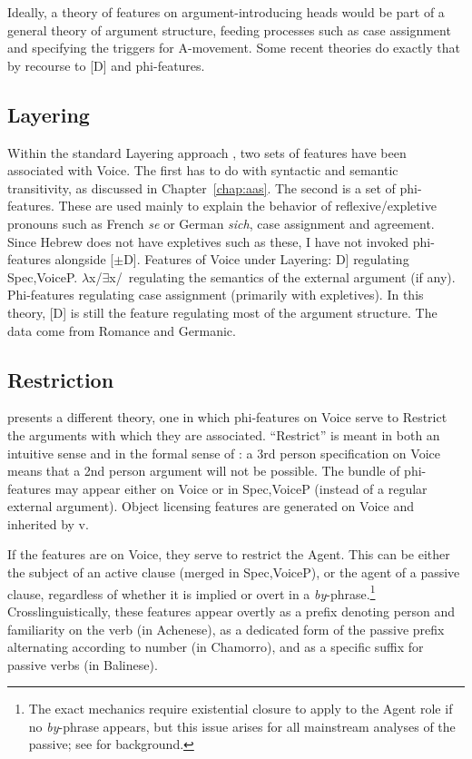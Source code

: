 Ideally, a theory of features on argument-introducing heads would be part of a general theory of argument structure, feeding processes such as case assignment and specifying the triggers for A-movement. Some recent theories do exactly that by recourse to [D] and phi-features.

	\subsection{Layering}
Within the standard Layering approach \citep{schaefer08,schaefer12,schaefer17oup}, two sets of features have been associated with Voice. The first has to do with syntactic and semantic transitivity, as discussed in Chapter~\ref{chap:aas}. The second is a set of phi-features. These are used mainly to explain the behavior of reflexive/expletive pronouns such as French \emph{se} or German \emph{sich}, case assignment and agreement. Since Hebrew does not have expletives such as these, I have not invoked phi-features alongside [$\pm$D].
\pex Features of Voice under Layering:
	\a {[}D] regulating Spec,VoiceP.
	\a $\lambda$x/$\exists$x/\zero~regulating the semantics of the external argument (if any).
	\a Phi-features regulating case assignment (primarily with expletives).
\xe
In this theory, [D] is still the feature regulating most of the argument structure. The data come from Romance and Germanic.

	\subsection{Restriction}
\cite{legate12lang,legate14} presents a different theory, one in which phi-features on Voice serve to Restrict the arguments with which they are associated. ``Restrict'' is meant in both an intuitive sense and in the formal sense of \cite{chungladusaw04}: a 3rd person specification on Voice means that a 2nd person argument will not be possible. The bundle of phi-features may appear either on Voice or in Spec,VoiceP (instead of a regular external argument). Object licensing features are generated on Voice and inherited by v.

If the features are on Voice, they serve to restrict the Agent. This can be either the subject of an active clause (merged in Spec,VoiceP), or the agent of a passive clause, regardless of whether it is implied or overt in a \emph{by}-phrase.\footnote{The exact mechanics require existential closure to apply to the Agent role if no \emph{by}-phrase appears, but this issue arises for all mainstream analyses of the passive; see \cite{williams15} for background.} Crosslinguistically, these features appear overtly as a prefix denoting person and familiarity on the verb (in Achenese), as a dedicated form of the passive prefix alternating according to number (in Chamorro), and as a specific suffix for  passive verbs (in Balinese).

